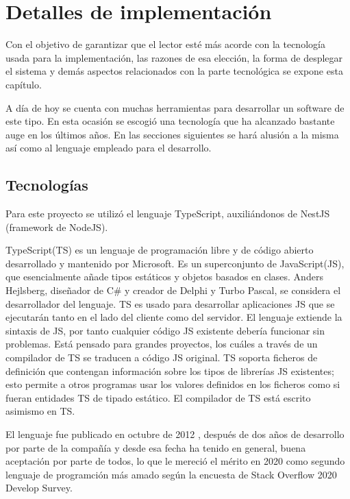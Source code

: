 \chapter{Detalles de implementación}\label{cap:implementation_details}

Con el objetivo de garantizar que el lector esté más acorde con la tecnología usada para la implementación, las razones de esa elección, la forma de desplegar el sistema y demás aspectos relacionados con la parte tecnológica se expone esta capítulo.

A día de hoy se cuenta con muchas herramientas para desarrollar un software de este tipo. En esta ocasión se escogió una tecnología que ha alcanzado bastante auge en los últimos años. En las secciones siguientes se hará alusión a la misma así como al lenguaje empleado para el desarrollo.

\section{Tecnologías}
Para este proyecto se utilizó el lenguaje TypeScript, auxiliándonos de NestJS (framework de NodeJS).

\label{lenguage}
\cite{wiki_ts}
TypeScript(TS) es un lenguaje de programación libre y de código abierto desarrollado y mantenido por Microsoft. Es un superconjunto de JavaScript(JS), que esencialmente añade tipos estáticos y objetos basados en clases. Anders Hejlsberg, diseñador de C\# y creador de Delphi y Turbo Pascal, se considera el desarrollador del lenguaje. TS es usado para desarrollar aplicaciones JS que se ejecutarán tanto en el lado del cliente como del servidor. El lenguaje extiende la sintaxis de JS, por tanto cualquier código JS existente debería  funcionar sin problemas. Está pensado para grandes proyectos, los cuáles a través de un compilador de TS se traducen a código JS original. TS soporta ficheros de definición que contengan información sobre los tipos de librerías JS existentes; esto permite a otros programas usar los valores definidos en los ficheros como si fueran entidades TS de tipado estático. El compilador de TS está escrito asimismo en TS. 

El lenguaje fue publicado en octubre de 2012 , después de dos años de desarrollo por parte de la compañía y desde esa fecha ha tenido en general, buena aceptación por parte de todos, lo que le mereció el mérito en 2020 como segundo lenguaje de programción más amado según la encuesta de Stack Overflow\cite{stack_overflow} 2020 Develop Survey.

